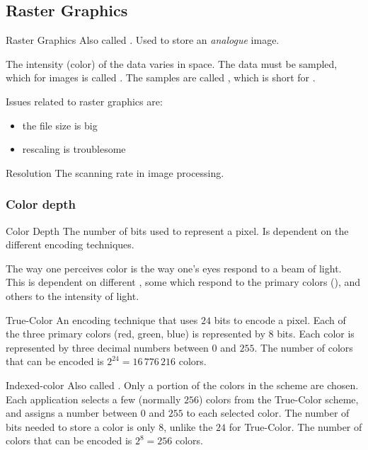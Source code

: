 \documentclass[../notes.tex]{subfiles}
\begin{document}
			\subsection{Raster Graphics}
				\begin{definition}{Raster Graphics}
					Also called . Used to store an \emph{analogue} image.
					\begin{indentparagraph}
						The intensity (color) of the data varies in space. The data must be sampled, which for images is called . The samples are called , which is short for .
					\end{indentparagraph}
				\end{definition}
				Issues related to raster graphics are:
				\begin{itemize}[nosep]
					\item the file size is big
					\item rescaling is troublesome
				\end{itemize}
				\begin{definition}{Resolution}
					The scanning rate in image processing.
				\end{definition}
				\subsubsection{Color depth}
					\begin{definition}{Color Depth}
						The number of bits used to represent a pixel. Is dependent on the different encoding techniques.
						\begin{indentparagraph}
							The way one perceives color is the way one's eyes respond to a beam of light. This is dependent on different , some which respond to the primary colors (), and others to the intensity of light.
						\end{indentparagraph}
					\end{definition}
					\pagebreak
					\begin{definition}{True-Color}
						An encoding technique that uses $24$ bits to encode a pixel. Each of the three primary colors (red, green, blue) is represented by $8$ bits. Each color is represented by three decimal numbers between $0$ and $255$. The number of colors that can be encoded is $2^{24} = 16\,776\,216$ colors.
					\end{definition}
					\begin{definition}{Indexed-color}
						Also called . Only a portion of the colors in the  scheme are chosen. Each application selects a few (normally $256$) colors from the True-Color scheme, and assigns a number between $0$ and $255$ to each selected color. The number of bits needed to store a color is only $8$, unlike the $24$ for True-Color. The number of colors that can be encoded is $2^{8} = 256$ colors.
					\end{definition}
\end{document}

